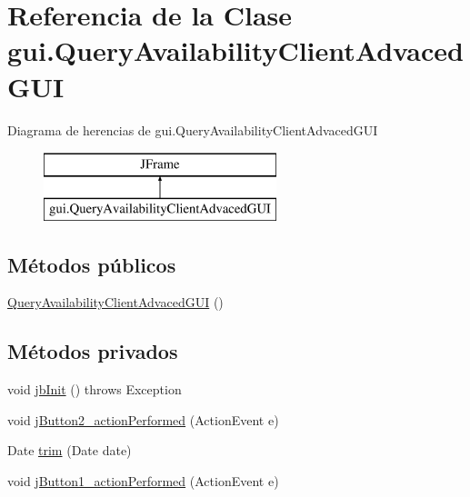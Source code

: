 \hypertarget{classgui_1_1_query_availability_client_advaced_g_u_i}{}\section{Referencia de la Clase gui.\+Query\+Availability\+Client\+Advaced\+G\+UI}
\label{classgui_1_1_query_availability_client_advaced_g_u_i}
Diagrama de herencias de gui.\+Query\+Availability\+Client\+Advaced\+G\+UI\begin{figure}[H]
\begin{center}
\leavevmode
\includegraphics[height=2.000000cm]{classgui_1_1_query_availability_client_advaced_g_u_i}
\end{center}
\end{figure}
\subsection*{Métodos públicos}
\begin{DoxyCompactItemize}
\item 
\mbox{\hyperlink{classgui_1_1_query_availability_client_advaced_g_u_i_a34bf220de5c36ffeed8d914786fcd68e}{Query\+Availability\+Client\+Advaced\+G\+UI}} ()
\end{DoxyCompactItemize}
\subsection*{Métodos privados}
\begin{DoxyCompactItemize}
\item 
void \mbox{\hyperlink{classgui_1_1_query_availability_client_advaced_g_u_i_ab3f117543db7303b67599eee5b8cfa4e}{jb\+Init}} ()  throws Exception   
\item 
void \mbox{\hyperlink{classgui_1_1_query_availability_client_advaced_g_u_i_a6c5498e5cb22fdb11570d0f794f465ab}{j\+Button2\+\_\+action\+Performed}} (Action\+Event e)
\item 
Date \mbox{\hyperlink{classgui_1_1_query_availability_client_advaced_g_u_i_a777c1d1163abf2060b78efaaf6ec56a0}{trim}} (Date date)
\item 
void \mbox{\hyperlink{classgui_1_1_query_availability_client_advaced_g_u_i_ae4951cca264e51c1017cd358da5bec56}{j\+Button1\+\_\+action\+Performed}} (Action\+Event e)
\end{DoxyCompactItemize}
